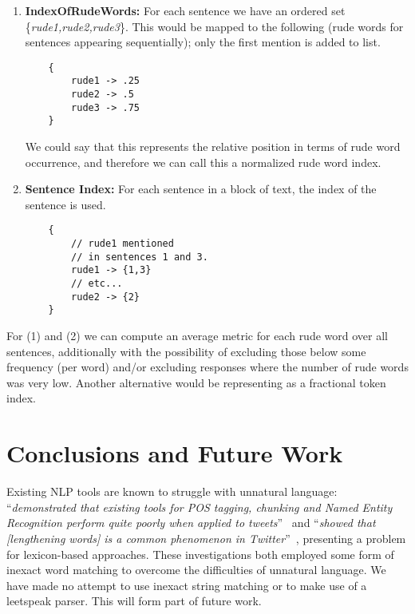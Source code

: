 \documentclass[letterpaper]{article}
\begin{document}
\begin{enumerate}
\item {\textbf{IndexOfRudeWords:}} For each sentence we have an
  ordered set \{{\emph{rude1,rude2,rude3}}\}. This would be mapped to
  the following (rude words for sentences appearing sequentially);
  only the first mention is added to list.\\

\begin{verbatim}
    {
        rude1 -> .25
        rude2 -> .5
        rude3 -> .75
    }

\end{verbatim}

We could say that this represents the relative position in terms of rude word occurrence, and therefore we can call this a normalized rude word index.\newline

\item {\textbf{Sentence Index:}} For each sentence in a block of text, the index of
the sentence is used.\\

\begin{verbatim}
    {
        // rude1 mentioned 
        // in sentences 1 and 3.
        rude1 -> {1,3}   
        // etc...
        rude2 -> {2}
    }

\end{verbatim}
\end{enumerate}

For (1) and (2) we can compute an average metric for each rude word
over all sentences, additionally with the possibility of excluding
those below some frequency (per word) and/or excluding responses where
the number of rude words was very low. Another alternative would be
representing as a fractional token index.


\section{Conclusions and Future Work}

Existing NLP tools are known to struggle with unnatural language:
``{\emph{demonstrated that existing tools for POS tagging, chunking
and Named Entity Recognition perform quite poorly when applied to
tweets}}''~\cite{ritter-et-al:2011} and ``{\emph{showed that
[lengthening words] is a common phenomenon in
Twitter}}''~\cite{brody+diakopoulos:2011}, presenting a problem for
lexicon-based approaches. These investigations both employed some form
of inexact word matching to overcome the difficulties of unnatural
language. We have made no attempt to use inexact string matching or to
make use of a leetspeak parser. This will form part of future work.
\end{document}
